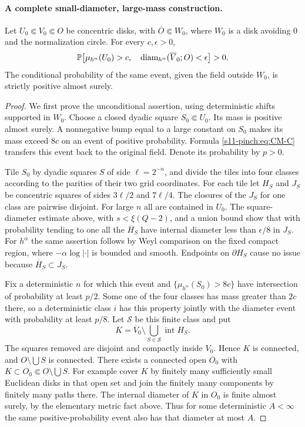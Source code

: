 \documentclass[12pt]{amsart}
\numberwithin{equation}{section}
\begin{document}
\paragraph{A complete small-diameter, large-mass construction.}
\begin{lemma}\label{s11-pinch:lem:massdiam}
Let $U_0\Subset V_0\Subset O$ be concentric disks, with
$\overline O\Subset W_0$, where $W_0$ is a disk avoiding $0$
and the normalization circle. For every $c,\epsilon>0$,
\[
 \mathbb P\!\left[
   \mu_{h^\alpha}(U_0)>c,\quad
   {\mbox{diam}}_{h^\alpha}(\overline V_0;O)<\epsilon
 \right]>0.
\]
The conditional probability of the same event, given the field
outside $W_0$, is strictly positive almost surely.
\end{lemma}
\begin{proof}
We first prove the unconditional assertion, using deterministic
shifts supported in $W_0$. Choose a closed dyadic square
$S_0\Subset U_0$. Its mass is positive almost surely.
A nonnegative bump equal to a large constant on $S_0$ makes
its mass exceed $8c$ on an event of positive probability.
Formula \eqref{s11-pinch:eq:CM-C} transfers this event back to the original
field. Denote its probability by $p>0$.

Tile $S_0$ by dyadic squares $S$ of side $\ell=2^{-n}$, and
divide the tiles into four classes according to the parities
of their two grid coordinates. For each tile let $H_S$ and
$J_S$ be concentric squares of sides $3\ell/2$ and $7\ell/4$.
The closures of the $J_S$ for one class are pairwise disjoint.
For large $n$ all are contained in $U_0$.
The square-diameter estimate above, with
$s<\xi(Q-2)$, and a union bound show that with probability
tending to one all the $\overline H_S$ have internal diameter
less than $\epsilon/8$ in $J_S$.
For $h^\alpha$ the same assertion follows by Weyl comparison
on the fixed compact region, where $-\alpha\log|\cdot|$ is
bounded and smooth. Endpoints on $\partial H_S$ cause no issue
because $\overline H_S\subset J_S$.

Fix a deterministic $n$ for which this event and
$\{\mu_{h^\alpha}(S_0)>8c\}$ have intersection of probability
at least $p/2$. Some one of the four classes has mass greater
than $2c$ there, so a deterministic class $i$ has this property
jointly with the diameter event with probability at least $p/8$.
Let $\mathcal S$ be this finite class and put
\[
 K=\overline V_0\setminus\bigcup_{S\in\mathcal S}\operatorname{int}H_S.
\]
The squares removed are disjoint and compactly inside $V_0$.
Hence $K$ is connected, and $O\setminus\bigcup S$ is connected.
There exists a connected open $O_0$ with
$K\subset O_0\Subset O\setminus\bigcup S$.
For example cover $K$ by finitely many sufficiently small
Euclidean disks in that open set and join the finitely many
components by finitely many paths there.
The internal diameter of $K$ in $O_0$ is finite almost surely,
by the elementary metric fact above. Thus for some deterministic
$A<\infty$ the same positive-probability event also has that
diameter at most $A$.


\end{proof}
\end{document}
